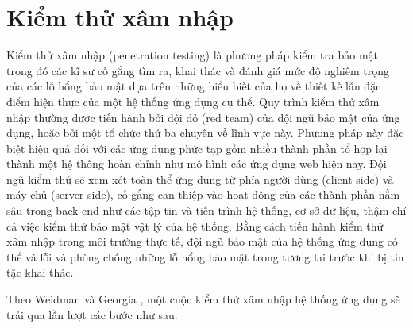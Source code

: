 \section{Kiểm thử xâm nhập}
Kiểm thử xâm nhập (penetration testing) \parencite{vimpari2015evaluation} là phương pháp kiểm tra bảo mật trong đó các kĩ sư cố gắng tìm ra, khai thác và đánh giá mức độ nghiêm trọng của các lỗ hổng bảo mật dựa trên những hiểu biết của họ về thiết kế lẫn đặc điểm hiện thực của một hệ thống ứng dụng cụ thể. Quy trình kiểm thử xâm nhập thường được tiến hành bởi đội đỏ (red team) của đội ngũ bảo mật của ứng dụng, hoặc bởi một tổ chức thứ ba chuyên về lĩnh vực này. Phương pháp này đặc biệt hiệu quả đối với các ứng dụng phức tạp gồm nhiều thành phần tổ hợp lại thành một hệ thông hoàn chỉnh như mô hình các ứng dụng web hiện nay. Đội ngũ kiểm thử sẽ xem xét toàn thể ứng dụng từ phía người dùng (client-side) và máy chủ (server-side), cố gắng can thiệp vào hoạt động của các thành phần nằm sâu trong back-end như các tập tin và tiến trình hệ thống, cơ sở dữ liệu, thậm chí cả việc kiểm thử bảo mật vật lý của hệ thống. Bằng cách tiến hành kiểm thử xâm nhập trong môi trường thực tế, đội ngũ bảo mật của hệ thống ứng dụng có thể vá lỗi và phòng chống những lỗ hổng bảo mật trong tương lai trước khi bị tin tặc khai thác.\par
Theo Weidman và Georgia \parencite{weidman2014penetration}, một cuộc kiểm thử xâm nhập hệ thống ứng dụng sẽ trải qua lần lượt các bước như sau.
